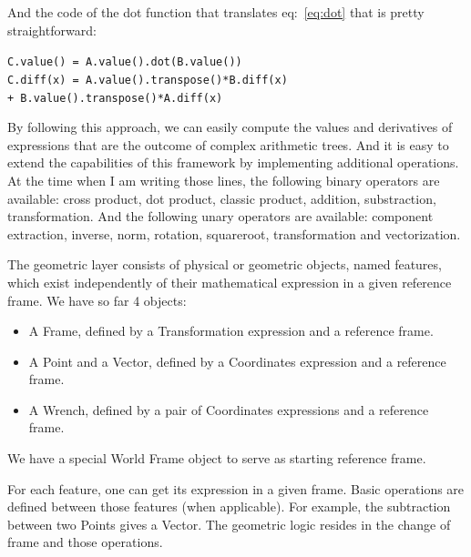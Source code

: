
And the code of the dot function that translates eq:~\ref{eq:dot} that is pretty straightforward:
\begin{center}
{\tt C.value() = A.value().dot(B.value())\\
C.diff(x) = A.value().transpose()*B.diff(x) \\ + B.value().transpose()*A.diff(x)}
\end{center}

By following this approach, we can easily compute the values and derivatives of expressions that are the outcome of complex arithmetic trees.
And it is easy to extend the capabilities of this framework by implementing additional operations.
At the time when I am writing those lines, the following binary operators are available: cross product, dot product, classic product, addition, substraction, transformation.
And the following unary operators are available: component extraction, inverse, norm, rotation, squareroot, transformation and vectorization.

The geometric layer consists of physical or geometric objects, named features, which exist independently of their mathematical expression in a given reference frame.
We have so far 4 objects:
\begin{itemize}
  \item A Frame, defined by a Transformation expression and a reference frame.
  \item A Point and a Vector, defined by a Coordinates expression and a reference frame.
  \item A Wrench, defined by a pair of Coordinates expressions and a reference frame.
\end{itemize}
We have a special World Frame object to serve as starting reference frame.

For each feature, one can get its expression in a given frame.
Basic operations are defined between those features (when applicable).
For example, the subtraction between two Points gives a Vector.
The geometric logic resides in the change of frame and those operations.


